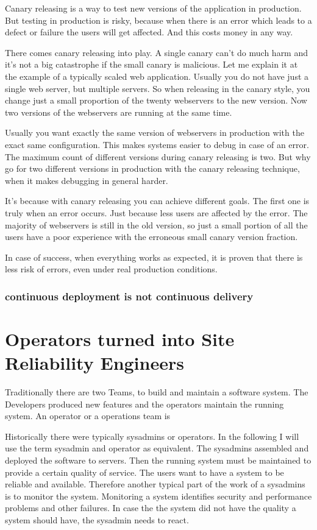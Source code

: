 Canary releasing is a way to test new versions of the application in production. But testing in production is risky, because when there is an error which leads to a defect or failure the users will get affected. And this costs money in any way.

There comes canary releasing into play. A single canary can't do much harm and it's not a big catastrophe if the small canary is malicious. Let me explain it at the example of a typically scaled web application. Usually you do not have just a single web server, but multiple servers. So when releasing in the canary style, you change just a small proportion of the twenty webservers to the new version. Now two versions of the webservers are running at the same time.

Usually you want exactly the same version of webservers in production with the exact same configuration. This makes systems easier to debug in case of an error. The maximum count of different versions during canary releasing is two. But why go for two different versions in production with the canary releasing technique, when it makes debugging in general harder.

It's because with canary releasing you can achieve different goals. The first one is truly when an error occurs. Just because less users are affected by the error. The majority of webservers is still in the old version, so just a small portion of all the users have a poor experience with the erroneous small canary version fraction.

In case of success, when everything works as expected, it is proven that there is less risk of errors, even under real production conditions.


\subsection{continuous deployment is not continuous delivery}

\chapter{Operators turned into Site Reliability Engineers}

Traditionally there are two Teams, to build and maintain a software system. The Developers produced new features and the operators maintain the running system. An operator or a operations team is

Historically there were typically sysadmins or operators. In the following I will use the term sysadmin and operator as equivalent. The sysadmins assembled and deployed the software to servers. Then the running system must be maintained to provide a certain quality of service. The users want to have a system to be reliable and available. Therefore another typical part of the work of a sysadmins is to monitor the system. Monitoring a system identifies security and performance problems and other failures. In case the the system did not have the quality a system should have, the sysadmin needs to react.

